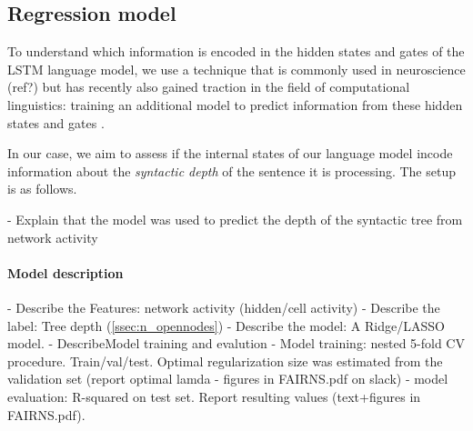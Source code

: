 \subsection{Regression model}\label{ssec:dc}

To understand which information is encoded in the hidden states and gates of the LSTM language model, we use a technique that is commonly used in neuroscience (ref?) but has recently also gained traction in the field of computational linguistics: training an additional model to predict information from these hidden states and gates \cite{Adi:etal:2017,Hupkes:etal:2017}.  

In our case, we aim to assess if the internal states of our language model incode information about the \textit{syntactic depth} of the sentence it is processing.
The setup is as follows.

- Explain that the model was used to predict the depth of the syntactic tree from network activity
\paragraph{Model description}
- Describe the Features: network activity (hidden/cell activity)
- Describe the label: Tree depth (\ref{ssec:n_opennodes})
- Describe the model: A Ridge/LASSO model.
- Describe{Model training and evalution}
- Model training: nested 5-fold CV procedure. Train/val/test. Optimal regularization size was estimated from the validation set (report optimal lamda - figures in FAIRNS.pdf on slack)
- model evaluation: R-squared on test set. Report resulting values (text+figures in FAIRNS.pdf). 


